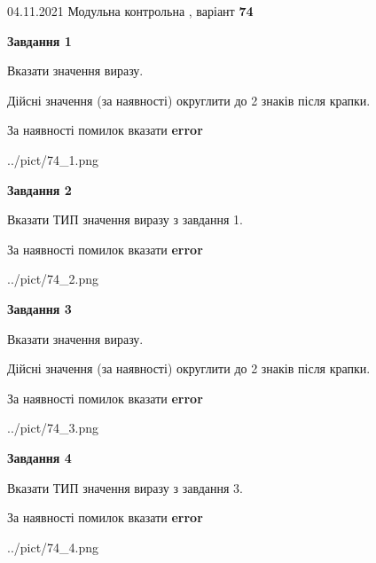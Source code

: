 \documentclass[11pt, ukrainian]{article}
\begin{document}
{04.11.2021 Модульна контрольна , варіант  \No \textbf { 74 }\par}
{
\begin {large}
{\begin {center}\textbf{Завдання 1}\end {center}}\par
Вказати значення виразу. \par
Дійсні значення (за наявності) округлити до 2 знаків після крапки. \par
За наявності помилок вказати \textbf{error}

\begin{center}
	{../pict/74_1.png}
\end{center}
\newpage

{\begin {center}\textbf{Завдання 2}\end {center}}\par
Вказати ТИП значення виразу з завдання 1. \par
За наявності помилок вказати \textbf{error}

\begin{center}
	{../pict/74_2.png}
\end{center}
\newpage

{\begin {center}\textbf{Завдання 3}\end {center}}\par
Вказати значення виразу. \par
Дійсні значення (за наявності) округлити до 2 знаків після крапки. \par
За наявності помилок вказати \textbf{error}

\begin{center}
	{../pict/74_3.png}
\end{center}
\newpage

{\begin {center}\textbf{Завдання 4}\end {center}}\par
Вказати ТИП значення виразу з завдання 3. \par
За наявності помилок вказати \textbf{error}

\begin{center}
	{../pict/74_4.png}
\end{center}
\newpage


\end{large}}
\end{document}
